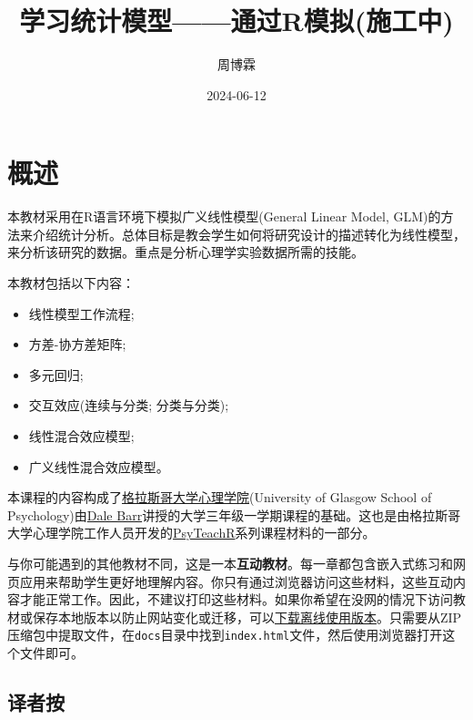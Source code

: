 \documentclass[
]{book}
\title{学习统计模型------通过R模拟(施工中)}
\author{周博霖}
\date{2024-06-12}
\providecommand{\tightlist}{%
  \setlength{\itemsep}{0pt}\setlength{\parskip}{0pt}}
\begin{document}
\maketitle

{
\setcounter{tocdepth}{1}
\tableofcontents
}
\hypertarget{ux6982ux8ff0}{%
\chapter*{概述}\label{ux6982ux8ff0}}

本教材采用在R语言环境下模拟广义线性模型(General Linear Model, GLM)的方法来介绍统计分析。总体目标是教会学生如何将研究设计的描述转化为线性模型，来分析该研究的数据。重点是分析心理学实验数据所需的技能。

本教材包括以下内容：

\begin{itemize}
\tightlist
\item
  线性模型工作流程;
\item
  方差-协方差矩阵;
\item
  多元回归;
\item
  交互效应(连续与分类; 分类与分类);
\item
  线性混合效应模型;
\item
  广义线性混合效应模型。
\end{itemize}

本课程的内容构成了\href{https://www.gla.ac.uk/schools/psychologyneuroscience/}{格拉斯哥大学心理学院}(University of Glasgow School of Psychology)由\href{https://www.gla.ac.uk/schools/psychologyneuroscience/staff/dalebarr/}{Dale Barr}讲授的大学三年级一学期课程的基础。这也是由格拉斯哥大学心理学院工作人员开发的\href{https://psyteachr.github.io/}{PsyTeachR}系列课程材料的一部分。

与你可能遇到的其他教材不同，这是一本\textbf{互动教材}。每一章都包含嵌入式练习和网页应用来帮助学生更好地理解内容。你只有通过浏览器访问这些材料，这些互动内容才能正常工作。因此，不建议打印这些材料。如果你希望在没网的情况下访问教材或保存本地版本以防止网站变化或迁移，可以\href{https://psyteachr.github.io/stat-models-v1/offline-textbook.zip}{下载离线使用版本}。只需要从ZIP压缩包中提取文件，在\texttt{docs}目录中找到\texttt{index.html}文件，然后使用浏览器打开这个文件即可。

\hypertarget{ux8bd1ux8005ux6309}{%
\section*{译者按}\label{ux8bd1ux8005ux6309}}
\end{document}
